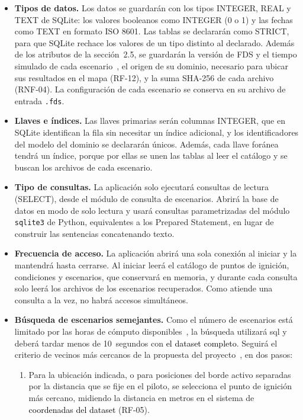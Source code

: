 \begin{itemize}
  \item \textbf{Tipos de datos.} Los datos se guardarán con los tipos INTEGER, REAL y TEXT de SQLite: los valores booleanos como INTEGER (0 o 1) y las fechas como TEXT en formato ISO 8601. Las tablas se declararán como STRICT, para que SQLite rechace los valores de un tipo distinto al declarado. Además de los atributos de la sección~2.5, se guardarán la versión de FDS y el tiempo simulado de cada escenario~\cite{vfp2026}, el origen de su dominio, necesario para ubicar sus resultados en el mapa (RF-12), y la suma SHA-256 de cada archivo (RNF-04). La configuración de cada escenario se conserva en su archivo de entrada \texttt{.fds}.
  \item \textbf{Llaves e índices.} Las llaves primarias serán columnas INTEGER, que en SQLite identifican la fila sin necesitar un índice adicional, y los identificadores del modelo del dominio se declararán únicos. Además, cada llave foránea tendrá un índice, porque por ellas se unen las tablas al leer el catálogo y se buscan los archivos de cada escenario.
  \item \textbf{Tipo de consultas.} La aplicación solo ejecutará consultas de lectura (SELECT), desde el módulo de consulta de escenarios. Abrirá la base de datos en modo de solo lectura y usará consultas parametrizadas del módulo \texttt{sqlite3} de Python, equivalentes a los Prepared Statement, en lugar de construir las sentencias concatenando texto.
  \item \textbf{Frecuencia de acceso.} La aplicación abrirá una sola conexión al iniciar y la mantendrá hasta cerrarse. Al iniciar leerá el catálogo de puntos de ignición, condiciones y escenarios, que conservará en memoria, y durante cada consulta solo leerá los archivos de los escenarios recuperados. Como atiende una consulta a la vez, no habrá accesos simultáneos.
  \item \textbf{Búsqueda de escenarios semejantes.} Como el número de escenarios está limitado por las horas de cómputo disponibles~\cite{pmp2026}, la búsqueda utilizará sql y deberá tardar menos de 10~segundos con \textcolor{black}{el dataset completo}. Seguirá el criterio de vecinos más cercanos de la propuesta del proyecto~\cite{vfp2026}, en dos pasos:
  \begin{enumerate}
    \item Para la ubicación indicada, o para posiciones del borde activo separadas por la distancia que se fije en el piloto, se selecciona el punto de ignición más cercano, midiendo la distancia en metros en el sistema de \textcolor{black}{coordenadas del dataset} (RF-05).

\end{enumerate}
\end{itemize}
